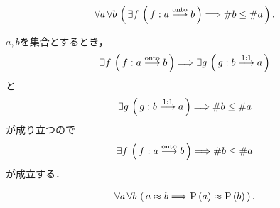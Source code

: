 	\begin{screen}
		\begin{thm}[全射が存在すれば濃度は大きい]
		\label{thm:if_exists_a_surjection_then_cardinal_of_target_is_bigger}
			\begin{align}
				\forall a\, \forall b\, \left(\, \exists f\, \left(\, f:a \overset{\mathrm{onto}}{\longrightarrow}  b\, \right)
				\Longrightarrow \# b \leq \# a\, \right).
			\end{align}
		\end{thm}
	\end{screen}
	
	\begin{prf}
		$a,b$を集合とするとき，
		\begin{align}
			\exists f\, \left(\, f:a \overset{\mathrm{onto}}{\longrightarrow} b\, \right)
			\Longrightarrow \exists g\, \left(\, g:b \overset{\mathrm{1:1}}{\longrightarrow}  a\, \right)
		\end{align}
		と
		\begin{align}
			\exists g\, \left(\, g:b \overset{\mathrm{1:1}}{\longrightarrow} a\, \right) \Longrightarrow \# b \leq \# a
		\end{align}
		が成り立つので
		\begin{align}
			\exists f\, \left(\, f:a \overset{\mathrm{onto}}{\longrightarrow} b\, \right) \Longrightarrow \# b \leq \# a
		\end{align}
		が成立する．
		\QED
	\end{prf}
	
	\begin{screen}
		\begin{thm}[対等な集合同士は冪も対等]
			\begin{align}
				\forall a\, \forall b\, \left(\, a \approx b \Longrightarrow \operatorname*{P} \left(a\right) \approx \operatorname*{P} \left(b\right)\, \right).
			\end{align}
		\end{thm}
	\end{screen}
	
